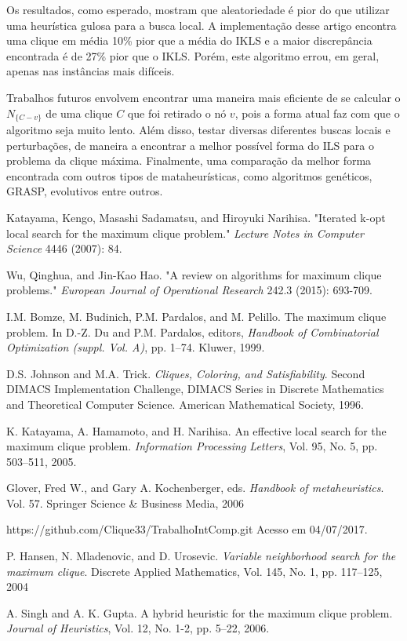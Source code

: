 \documentclass{article}
\begin{document}
Os resultados, como esperado, mostram que aleatoriedade é pior do que utilizar uma heurística gulosa para a busca local. A implementação desse artigo encontra uma clique em média 10\% pior que a média do IKLS \cite{kopt} e a maior discrepância encontrada é de 27\% pior que o IKLS. Porém, este algoritmo errou, em geral, apenas nas instâncias mais difíceis.\par

Trabalhos futuros envolvem encontrar uma maneira mais eficiente de se calcular o $N_{\{C-v\}}$ de uma clique $C$ que foi retirado o nó $v$, pois a forma atual faz com que o algoritmo seja muito lento. Além disso, testar diversas diferentes buscas locais e perturbações, de maneira a encontrar a melhor possível forma do ILS para o problema da clique máxima. Finalmente, uma comparação da melhor forma encontrada com outros tipos de mataheurísticas, como algoritmos genéticos, GRASP, evolutivos entre outros.

\begin{thebibliography}{58}

  Katayama, Kengo, Masashi Sadamatsu, and Hiroyuki Narihisa. 
"Iterated k-opt local search for the maximum clique problem." 
\textit{Lecture Notes in Computer Science} 4446 (2007): 84.

Wu, Qinghua, and Jin-Kao Hao. 
"A review on algorithms for maximum clique problems." 
\textit{European Journal of Operational Research} 242.3 (2015): 693-709.

I.M. Bomze, M. Budinich, P.M. Pardalos, and M. Pelillo. The maximum clique
problem. In D.-Z. Du and P.M. Pardalos, editors, \textit{Handbook of Combinatorial
Optimization (suppl. Vol. A)}, pp. 1–74. Kluwer, 1999.

D.S. Johnson and M.A. Trick. \textit{Cliques, Coloring, and Satisfiability}. Second DIMACS
Implementation Challenge, DIMACS Series in Discrete Mathematics and
Theoretical Computer Science. American Mathematical Society, 1996.

 K. Katayama, A. Hamamoto, and H. Narihisa. An effective local search for the
maximum clique problem. \textit{Information Processing Letters}, Vol. 95, No. 5, pp.
503–511, 2005.

Glover, Fred W., and Gary A. Kochenberger, eds. \textit{Handbook of metaheuristics}. Vol. 57. Springer Science \& Business Media, 2006

https://github.com/Clique33/TrabalhoIntComp.git Acesso em 04/07/2017.

P. Hansen, N. Mladenovic, and D. Urosevic. \textit{Variable neighborhood search for
the maximum clique}. Discrete Applied Mathematics, Vol. 145, No. 1, pp. 117–125,
2004

A. Singh and A. K. Gupta. A hybrid heuristic for the maximum clique problem.
\textit{Journal of Heuristics}, Vol. 12, No. 1-2, pp. 5–22, 2006.

\end{thebibliography}
\end{document}
